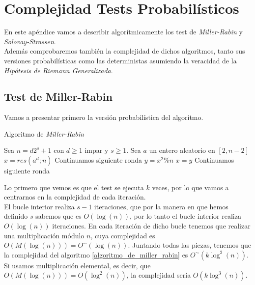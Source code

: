 
\chapter{Complejidad Tests Probabilísticos}\label{complejidad_tests_probabilisticos}

En este apéndice vamos a describir algorítmicamente los test de \textit{Miller-Rabin} y \textit{Solovay-Strassen}.\\

Además comprobaremos también la complejidad de dichos algoritmos, tanto sus versiones probabilísticas como las deterministas asumiendo la veracidad de la \textit{Hipótesis de Riemann Generalizada}.

\section{Test de Miller-Rabin}

Vamos a presentar primero la versión probabilística del algoritmo.

\begin{algorithm}[H]
	\caption{Algoritmo de \textit{Miller-Rabin}}\label{algoritmo_de_miller_rabin}
	\begin{algorithmic}[1]
			\State Sea $n = d2^s + 1$ con $d \geq 1$ impar y $s \geq 1$.
				\State Sea $a$ un entero aleatorio en $[2, n-2]$
				\State $x = res(a^d; n)$
					\State Continuamos siguiente ronda
				\EndIf
					\State $y = x^2 \% n$
						\State {}
					\EndIf
					\State $x = y$
						\State Continuamos siguiente ronda
					\EndIf
				\EndFor
				\State {}
			\EndFor
			\State {}
		\EndProcedure
	\end{algorithmic}
\end{algorithm}

Lo primero que vemos es que el test se ejecuta $k$ veces, por lo que vamos a centrarnos en la complejidad de cada iteración.\\

El bucle interior realiza $s-1$ iteraciones, que por la manera en que hemos definido $s$ sabemos que es $O(\log(n))$, por lo tanto el bucle interior realiza $O(\log(n))$ iteraciones. En cada iteración de dicho bucle tenemos que realizar una multiplicación módulo $n$, cuya complejidad es $O(M(\log(n))) = O^\sim(\log(n))$. Juntando todas las piezas, tenemos que la complejidad del algoritmo \ref{algoritmo_de_miller_rabin} es $O^\sim(k\log^2(n))$. Si usamos multiplicación elemental, es decir, que $O(M(\log(n))) = O(\log^2(n))$, la complejidad sería $O(k\log^3(n))$.\\

